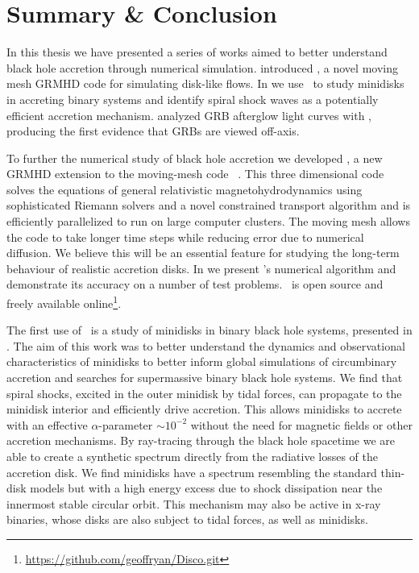 \chapter*{Summary \& Conclusion}

In this thesis we have presented a series of works aimed to better understand black hole accretion through numerical simulation.   introduced \grdisco, a novel moving mesh GRMHD code for simulating disk-like flows.  In  we use \discogr\ to study minidisks in accreting binary systems and identify spiral shock waves as a potentially efficient accretion mechanism.   analyzed GRB afterglow light curves with \scalefit, producing the first evidence that GRBs are viewed off-axis.

To further the numerical study of black hole accretion we developed \grdisco, a new GRMHD extension to the moving-mesh code \disco\ \citep{Duffell16}.  This three dimensional code solves the equations of general relativistic magnetohydrodynamics using sophisticated Riemann solvers and a novel constrained transport algorithm and is efficiently parallelized to run on large computer clusters.  The moving mesh allows the code to take longer time steps while reducing error due to numerical diffusion.  We believe this will be an essential feature for studying the long-term behaviour of realistic accretion disks.  In  we present \discogr 's numerical algorithm and demonstrate its accuracy on a number of test problems.  \discogr\ is open source and freely available online\footnote{\url{https://github.com/geoffryan/Disco.git}}.

The first use of \discogr\ is a study of minidisks in binary black hole systems, presented in .  The aim of this work was to better understand the dynamics and observational characteristics of minidisks to better inform global simulations of circumbinary accretion and searches for supermassive binary black hole systems.  We find that spiral shocks, excited in the outer minidisk by tidal forces, can propagate to the minidisk interior and efficiently drive accretion.  This allows minidisks to accrete with an effective $\alpha$-parameter $\sim 10^{-2}$ without the need for magnetic fields or other accretion mechanisms.  By ray-tracing through the black hole spacetime we are able to create a synthetic spectrum directly from the radiative losses of the accretion disk.  We find minidisks have a spectrum resembling the standard thin-disk models but with a high energy excess due to shock dissipation near the innermost stable circular orbit.  This mechanism may also be active in x-ray binaries, whose disks are also subject to tidal forces, as well as minidisks.


